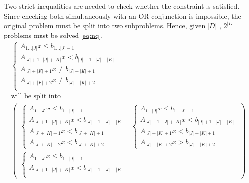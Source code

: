 \documentclass[runningheads]{llncs}
\begin{document}
Two strict inequalities are needed to check whether the constraint is satisfied.
Since checking both simultaneously with an OR conjunction is impossible, the original problem must be split into two subproblems.
Hence, given $|D|$ \nqcs, $2^{|D|}$ problems must be solved \eqref{eq:nq}.
\begin{equation}
    \label{eq:nq}
    \begin{gathered}
        \begin{cases}
            A_{1 \dots |J|} x \le b_{1 \dots |J| - 1}                 \\
            A_{|J| + 1\dots |J| + |K|} x < b_{|J| + 1\dots |J| + |K|} \\
            A_{|J| + |K| + 1} x \ne b_{|J| + |K| + 1}                 \\
            A_{|J| + |K| + 2} x \ne b_{|J| + |K| + 2}                 \\
        \end{cases}
        \\
        \text{will be split into}
        \\
        \begin{pmatrix}
            \begin{cases}
                A_{1 \dots |J|} x \le b_{1 \dots |J| - 1}                 \\
                A_{|J| + 1\dots |J| + |K|} x < b_{|J| + 1\dots |J| + |K|} \\
                A_{|J| + |K| + 1} x < b_{|J| + |K| + 1}                   \\
                A_{|J| + |K| + 2} x < b_{|J| + |K| + 2}
            \end{cases}
             &
            \begin{cases}
                A_{1 \dots |J|} x \le b_{1 \dots |J| - 1}                 \\
                A_{|J| + 1\dots |J| + |K|} x < b_{|J| + 1\dots |J| + |K|} \\
                A_{|J| + |K| + 1} x < b_{|J| + |K| + 1}                   \\
                A_{|J| + |K| + 2} x > b_{|J| + |K| + 2}
            \end{cases}
            \\
            \begin{cases}
                A_{1 \dots |J|} x \le b_{1 \dots |J| - 1}                 \\
                A_{|J| + 1\dots |J| + |K|} x < b_{|J| + 1\dots |J| + |K|} \\

\end{cases}
\end{pmatrix}
\end{gathered}
\end{equation}
\end{document}
